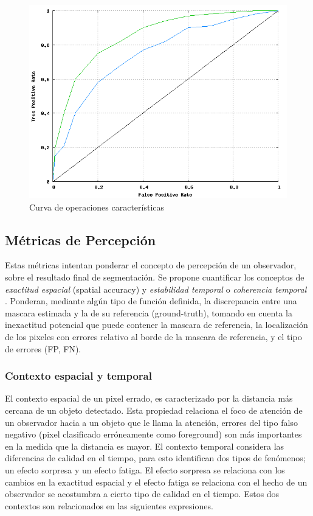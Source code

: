 \begin{figure}[!ht]
\centering
\includegraphics[scale=0.5]{img/curva_operaciones_caracteristicas}
\caption{Curva de operaciones características}
\label{fig:tpr_fpr}
\end{figure}




\subsection{Métricas de Percepción}

Estas métricas intentan ponderar el concepto de percepción de un observador, sobre el resultado final de segmentación. Se propone cuantificar los conceptos de \emph{exactitud espacial} (spatial accuracy) y \emph{estabilidad temporal} \cite{liu_metrics_2011} \cite{cavallaro_objective_2002} o \emph{coherencia temporal} \cite{villegas_perceptually-weighted_2004}. Ponderan, mediante algún tipo de función definida, la discrepancia entre una mascara estimada y la de su referencia (ground-truth), tomando en cuenta la inexactitud potencial que puede contener la mascara de referencia, la localización de los pixeles con errores relativo al borde de la mascara de referencia, y el tipo de errores (FP, FN). 

\subsubsection{Contexto espacial y temporal}
El contexto espacial \cite{cavallaro_objective_2002} de un pixel errado, es caracterizado por la distancia más cercana de un objeto detectado. Esta propiedad relaciona el foco de atención de un observador hacia a un objeto que le llama la atención, errores del tipo falso negativo (pixel clasificado erróneamente como foreground) son más importantes en la medida que la distancia es mayor. El contexto temporal considera las diferencias de calidad en el tiempo, para esto identifican dos tipos de fenómenos; un efecto sorpresa y un efecto fatiga. El efecto sorpresa se relaciona con los cambios en la exactitud espacial y el efecto fatiga se relaciona con el hecho de un observador se acostumbra a cierto tipo de calidad en el tiempo. Estos dos contextos son relacionados en las siguientes expresiones.

